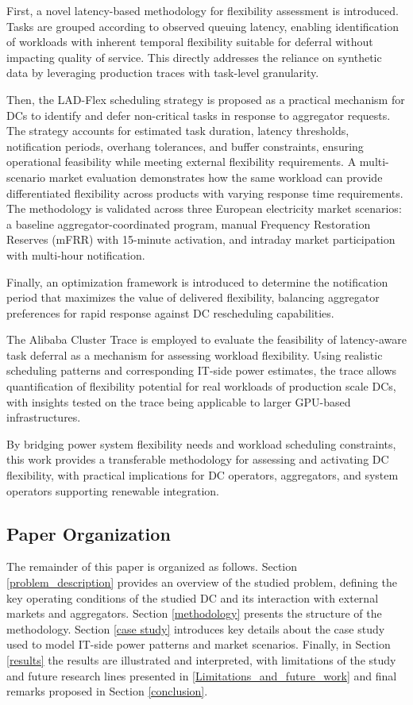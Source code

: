 \documentclass[preprint,12pt]{elsarticle}
\begin{document}
First, a novel latency-based methodology for flexibility assessment is introduced. Tasks are grouped according to observed queuing latency, enabling identification of workloads with inherent temporal flexibility suitable for deferral without impacting quality of service. This directly addresses the reliance on synthetic data by leveraging production traces with task-level granularity.

Then, the LAD-Flex scheduling strategy is proposed as a practical mechanism for DCs to identify and defer non-critical tasks in response to aggregator requests. The strategy accounts for estimated task duration, latency thresholds, notification periods, overhang tolerances, and buffer constraints, ensuring operational feasibility while meeting external flexibility requirements. A multi-scenario market evaluation demonstrates how the same workload can provide differentiated flexibility across products with varying response time requirements. The methodology is validated across three European electricity market scenarios: a baseline aggregator-coordinated program, manual Frequency Restoration Reserves (mFRR) with 15-minute activation, and intraday market participation with multi-hour notification.

Finally, an optimization framework is introduced to determine the notification period that maximizes the value of delivered flexibility, balancing aggregator preferences for rapid response against DC rescheduling capabilities.

The Alibaba Cluster Trace is employed to evaluate the feasibility of latency-aware task deferral as a mechanism for assessing workload flexibility. Using realistic scheduling patterns and corresponding IT-side power estimates, the trace allows quantification of flexibility potential for real workloads of production scale DCs, with insights tested on the trace being applicable to larger GPU-based infrastructures.

By bridging power system flexibility needs and workload scheduling constraints, this work provides a transferable methodology for assessing and activating DC flexibility, with practical implications for DC operators, aggregators, and system operators supporting renewable integration.

\subsection{Paper Organization}
The remainder of this paper is organized as follows. Section \ref{problem_description} provides an overview of the studied problem, defining the key operating conditions of the studied DC and its interaction with external markets and aggregators. Section \ref{methodology} presents the structure of the methodology. Section \ref{case study} introduces key details about the case study used to model IT-side power patterns and market scenarios. Finally, in Section \ref{results} the results are illustrated and interpreted, with limitations of the study and future research lines presented in \ref{Limitations_and_future_work} and final remarks proposed in Section \ref{conclusion}.
\end{document}
